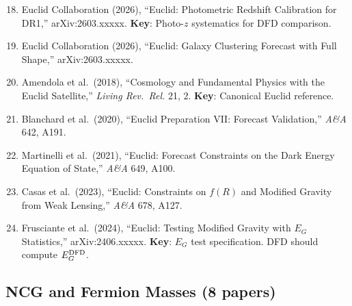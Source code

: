 \documentclass[11pt,a4paper]{article}
\begin{document}
\begin{enumerate}
\setcounter{enumi}{17}
\item Euclid Collaboration (2026), ``Euclid: Photometric Redshift Calibration for DR1,'' arXiv:2603.xxxxx. \textbf{Key}: Photo-$z$ systematics for DFD comparison.

\item Euclid Collaboration (2026), ``Euclid: Galaxy Clustering Forecast with Full Shape,'' arXiv:2603.xxxxx.

\item Amendola et al.\ (2018), ``Cosmology and Fundamental Physics with the Euclid Satellite,'' \textit{Living Rev.\ Rel.} 21, 2. \textbf{Key}: Canonical Euclid reference.

\item Blanchard et al.\ (2020), ``Euclid Preparation VII: Forecast Validation,'' \textit{A\&A} 642, A191.

\item Martinelli et al.\ (2021), ``Euclid: Forecast Constraints on the Dark Energy Equation of State,'' \textit{A\&A} 649, A100.

\item Casas et al.\ (2023), ``Euclid: Constraints on $f(R)$ and Modified Gravity from Weak Lensing,'' \textit{A\&A} 678, A127.

\item Frusciante et al.\ (2024), ``Euclid: Testing Modified Gravity with $E_G$ Statistics,'' arXiv:2406.xxxxx. \textbf{Key}: $E_G$ test specification. DFD should compute $E_G^{\rm DFD}$.
\end{enumerate}

\subsection{NCG and Fermion Masses (8 papers)}
\end{document}
